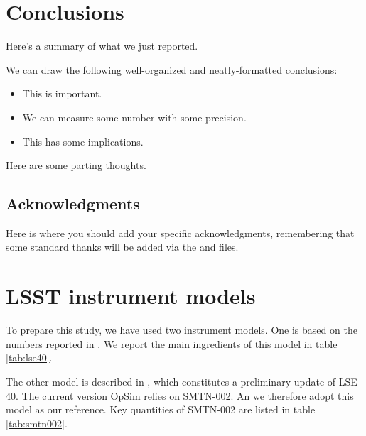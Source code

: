 \documentclass[\docopts]{\docclass}
\begin{document}

\section{Conclusions}
\label{sec:conclusions}

Here's a summary of what we just reported.

We can draw the following well-organized and neatly-formatted conclusions:
\begin{itemize}
  \item This is important.
  \item We can measure some number with some precision.
  \item This has some implications.
\end{itemize}

Here are some parting thoughts.



\subsection*{Acknowledgments}

Here is where you should add your specific acknowledgments, remembering that some standard thanks will be added via the  and  files.









\appendix

\section{LSST instrument models}

To prepare this study, we have used two instrument models.  One is
based on the numbers reported in \cite[][LSE-40 hereafter]{LSE-40}.
We report the main ingredients of this model in table \ref{tab:lse40}. 

The other model is described in \cite[][hereafter
SMTN-002)]{SMTN-002}, which constitutes a preliminary update of
LSE-40.  The current version OpSim relies on SMTN-002. An we therefore
adopt this model as our reference. Key quantities of SMTN-002 are
listed in table \ref{tab:smtn002}.
\end{document}

